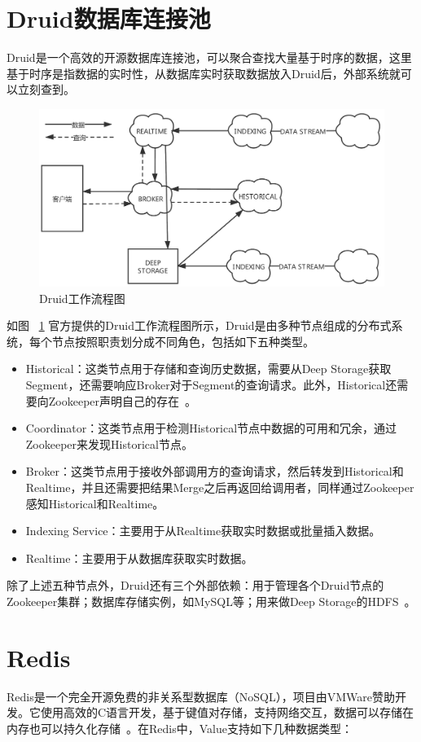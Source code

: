 \section{Druid数据库连接池}
Druid是一个高效的开源数据库连接池，可以聚合查找大量基于时序的数据，这里基于时序是指数据的实时性，从数据库实时获取数据放入Druid后，外部系统就可以立刻查到。

\begin{figure}[htbp!]
    \centering
    \includegraphics[width=5in]{FIGs/chapter2/druid.pdf}
    \caption{Druid工作流程图}\label{fig_druidCH2}
\end{figure}
如图
~\ref{fig_druidCH2}
官方提供的Druid工作流程图所示，Druid是由多种节点组成的分布式系统，每个节点按照职责划分成不同角色，包括如下五种类型。

\begin{itemize}
    \item Historical：这类节点用于存储和查询历史数据，需要从Deep Storage获取Segment，还需要响应Broker对于Segment的查询请求。此外，Historical还需要向Zookeeper声明自己的存在~\cite{yang2014druid}。
    \item Coordinator：这类节点用于检测Historical节点中数据的可用和冗余，通过Zookeeper来发现Historical节点。
    \item Broker：这类节点用于接收外部调用方的查询请求，然后转发到Historical和Realtime，并且还需要把结果Merge之后再返回给调用者，同样通过Zookeeper感知Historical和Realtime。
    \item Indexing Service：主要用于从Realtime获取实时数据或批量插入数据。
    \item Realtime：主要用于从数据库获取实时数据。
\end{itemize}

除了上述五种节点外，Druid还有三个外部依赖：用于管理各个Druid节点的Zookeeper集群；数据库存储实例，如MySQL等；用来做Deep Storage的HDFS~\cite{singh1990druid}。

\section{Redis}
Redis是一个完全开源免费的非关系型数据库（NoSQL），项目由VMWare赞助开发。它使用高效的C语言开发，基于键值对存储，支持网络交互，数据可以存储在内存也可以持久化存储~\cite{carlson2013redis}。在Redis中，Value支持如下几种数据类型：

